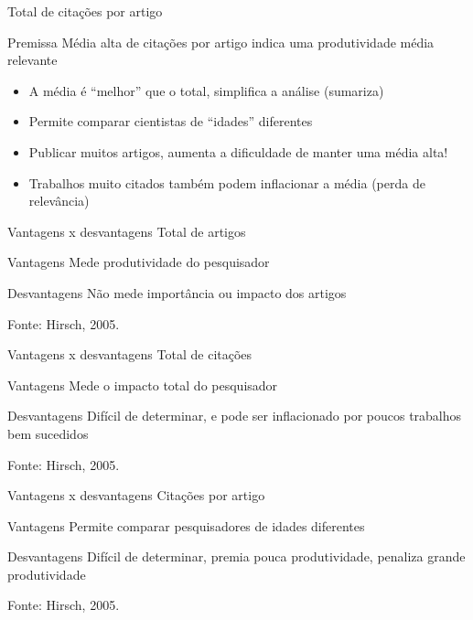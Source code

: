\documentclass{beamer}
\begin{document}
\begin{frame}{Total de citações por artigo}
  \begin{block}{Premissa}
    Média alta de citações por artigo indica uma produtividade média relevante
  \end{block}
  \begin{itemize}
  \item A média é ``melhor'' que o total, simplifica a análise (sumariza)
  \item Permite comparar cientistas de ``idades'' diferentes
  \item Publicar muitos artigos, aumenta a dificuldade de manter uma média alta!
  \item Trabalhos muito citados também podem inflacionar a média (perda de relevância)
  \end{itemize}
\end{frame}

\begin{frame}{Vantagens x desvantagens}
  Total de artigos
  \begin{block}{Vantagens}
    Mede produtividade do pesquisador
  \end{block}
  \begin{block}{Desvantagens}
    Não mede importância ou impacto dos artigos
  \end{block}

\vfill
Fonte: Hirsch, 2005.
\end{frame}

\begin{frame}{Vantagens x desvantagens}
Total de citações
  \begin{block}{Vantagens}
    Mede o impacto total do pesquisador
  \end{block}
  \begin{block}{Desvantagens}
    Difícil de determinar, e pode ser inflacionado por poucos trabalhos bem sucedidos
  \end{block}

\vfill
Fonte: Hirsch, 2005.
\end{frame}

\begin{frame}{Vantagens x desvantagens}
Citações por artigo
  \begin{block}{Vantagens}
    Permite comparar pesquisadores de idades diferentes
  \end{block}
  \begin{block}{Desvantagens}
    Difícil de determinar, premia pouca produtividade, penaliza grande produtividade
  \end{block}

\vfill
Fonte: Hirsch, 2005.
\end{frame}
\end{document}
